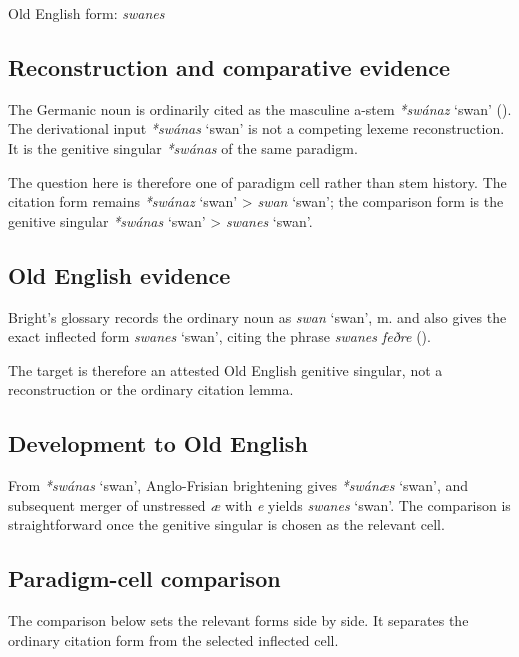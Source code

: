 \documentclass[
  british,
  a4paper,
  openany]{book}
\providecommand{\Recon}[1]{\emph{*#1}}
{\catcode`→=\active \global\def→{\ensuremath{\rightarrow}}}
\providecommand{\Recon}[1]{\emph{*#1}}
{\catcode`→=\active \global\def→{\ensuremath{\rightarrow}}}
\begin{document}
Old English form: \emph{swanes}

\subsection{Reconstruction and comparative
evidence}\label{reconstruction-and-comparative-evidence-98}

The Germanic noun is ordinarily cited as the masculine a-stem
{\Recon{swánaz} `swan'} (). The
derivational input \Recon{swánas} `swan' is not a competing lexeme
reconstruction. It is the genitive singular {\Recon{swánas}} of the same
paradigm.

The question here is therefore one of paradigm cell rather than stem
history. The citation form remains {\Recon{swánaz} `swan'}
\textgreater{} {\emph{swan}} `swan'; the comparison form is the genitive
singular {\Recon{swánas} `swan'} \textgreater{} {\emph{swanes}} `swan'.

\subsection{Old English evidence}\label{old-english-evidence-98}

Bright's glossary records the ordinary noun as {\emph{swan}} `swan', m.
and also gives the exact inflected form {\emph{swanes}} `swan', citing
the phrase \emph{swanes feðre}
().

The target is therefore an attested Old English genitive singular, not a
reconstruction or the ordinary citation lemma.

\subsection{Development to Old
English}\label{development-to-old-english-98}

From \Recon{swánas} `swan', Anglo-Frisian brightening gives
\Recon{swánæs} `swan', and subsequent merger of unstressed \emph{æ} with
\emph{e} yields \emph{swanes} `swan'. The comparison is straightforward
once the genitive singular is chosen as the relevant cell.

\subsection{Paradigm-cell comparison}\label{paradigm-cell-comparison}

The comparison below sets the relevant forms side by side. It separates
the ordinary citation form from the selected inflected cell.
\end{document}
